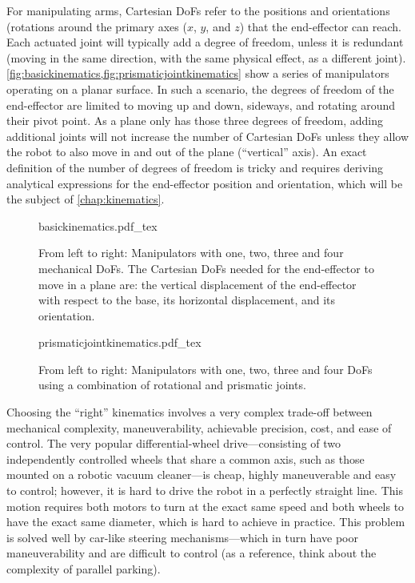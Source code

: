 For manipulating arms, Cartesian DoFs refer to the positions and orientations (rotations around the primary axes ($x$, $y$, and $z$) that the end-effector can reach. Each actuated joint will typically add a degree of freedom, unless it is redundant (moving in the same direction, with the same physical effect, as a different joint). \cref{fig:basickinematics,fig:prismaticjointkinematics} show a series of manipulators operating on a planar surface. In such a scenario, the degrees of freedom of the end-effector are limited to moving up and down, sideways, and rotating around their pivot point. As a plane only has those three degrees of freedom, adding additional joints will not increase the number of Cartesian DoFs unless they allow the robot to also move in and out of the plane (``vertical'' axis).
%
An exact definition of the number of degrees of freedom is tricky and requires deriving analytical expressions for the end-effector position and orientation, which will be the subject of \cref{chap:kinematics}.

\begin{figure}[!htb]
    \centering
    \def\svgwidth{\textwidth}
    {basickinematics.pdf_tex}
    \caption{From left to right: Manipulators with one, two, three and four mechanical DoFs. The Cartesian DoFs needed for the end-effector to move in a plane are: the vertical displacement of the end-effector with respect to the base, its horizontal displacement, and its orientation.}
    \label{fig:basickinematics}
\end{figure}

\begin{figure}[!htb]
    \centering
    \def\svgwidth{\textwidth}
    {prismaticjointkinematics.pdf_tex}
    \caption{From left to right: Manipulators with one, two, three and four DoFs using a combination of rotational and prismatic joints.}
    \label{fig:prismaticjointkinematics}
\end{figure}

Choosing the ``right'' kinematics involves a very complex trade-off between mechanical complexity, maneuverability, achievable precision, cost, and ease of control. The very popular differential-wheel drive---consisting of two independently controlled wheels that share a common axis, such as those mounted on a robotic vacuum cleaner---is cheap, highly maneuverable and easy to control; however, it is hard to drive the robot in a perfectly straight line. This motion requires both motors to turn at the exact same speed and both wheels to have the exact same diameter, which is hard to achieve in practice. This problem is solved well by car-like steering mechanisms---which in turn have poor maneuverability and are difficult to control (as a reference, think about the complexity of parallel parking).

